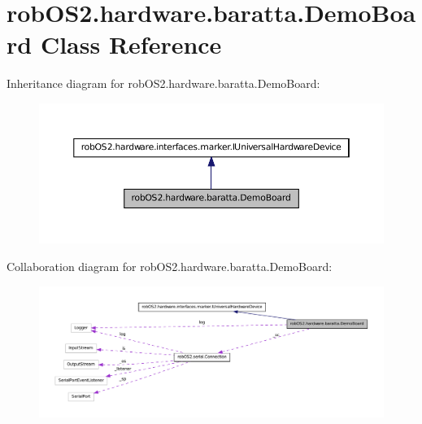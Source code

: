 \hypertarget{classrob_o_s2_1_1hardware_1_1baratta_1_1_demo_board}{
\section{robOS2.hardware.baratta.DemoBoard Class Reference}
\label{classrob_o_s2_1_1hardware_1_1baratta_1_1_demo_board}
}


Inheritance diagram for robOS2.hardware.baratta.DemoBoard:\nopagebreak
\begin{figure}[H]
\begin{center}
\leavevmode
\includegraphics[width=394pt]{classrob_o_s2_1_1hardware_1_1baratta_1_1_demo_board__inherit__graph}
\end{center}
\end{figure}


Collaboration diagram for robOS2.hardware.baratta.DemoBoard:\nopagebreak
\begin{figure}[H]
\begin{center}
\leavevmode
\includegraphics[width=400pt]{classrob_o_s2_1_1hardware_1_1baratta_1_1_demo_board__coll__graph}
\end{center}
\end{figure}
